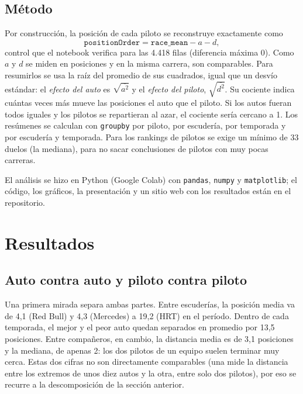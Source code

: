 \documentclass[11pt,a4paper]{article}
\begin{document}
\subsection{Método}
Por construcción, la posición de cada piloto se reconstruye exactamente como
\begin{equation}
\texttt{positionOrder} = \texttt{race\_mean} - a - d ,
\end{equation}
control que el notebook verifica para las 4.418 filas (diferencia máxima 0).
Como $a$ y $d$ se miden en posiciones y en la misma carrera, son comparables.
Para resumirlos se usa la raíz del promedio de sus cuadrados, igual que un
desvío estándar: el \emph{efecto del auto} es $\sqrt{\overline{a^2}}$ y el
\emph{efecto del piloto}, $\sqrt{\overline{d^2}}$. Su cociente indica cuántas
veces más mueve las posiciones el auto que el piloto. Si los autos fueran
todos iguales y los pilotos se repartieran al azar, el cociente sería cercano
a 1. Los resúmenes se calculan con \texttt{groupby} por piloto, por escudería,
por temporada y por escudería y temporada. Para los rankings de pilotos se
exige un mínimo de 33 duelos (la mediana), para no sacar conclusiones de
pilotos con muy pocas carreras.

El análisis se hizo en Python (Google Colab) con \texttt{pandas},
\texttt{numpy} y \texttt{matplotlib}; el código, los gráficos, la
presentación y un sitio web con los resultados están en el repositorio.

\section{Resultados}

\subsection{Auto contra auto y piloto contra piloto}
Una primera mirada separa ambas partes. Entre escuderías, la posición media va
de 4,1 (Red Bull) y 4,3 (Mercedes) a 19,2 (HRT) en el período. Dentro de cada
temporada, el mejor y el peor auto quedan separados en promedio por 13,5
posiciones. Entre compañeros, en cambio, la distancia media es de 3,1
posiciones y la mediana, de apenas 2: los dos pilotos de un equipo suelen
terminar muy cerca. Estas dos cifras no son directamente comparables (una mide
la distancia entre los extremos de unos diez autos y la otra, entre solo dos
pilotos), por eso se recurre a la descomposición de la sección anterior.
\end{document}
